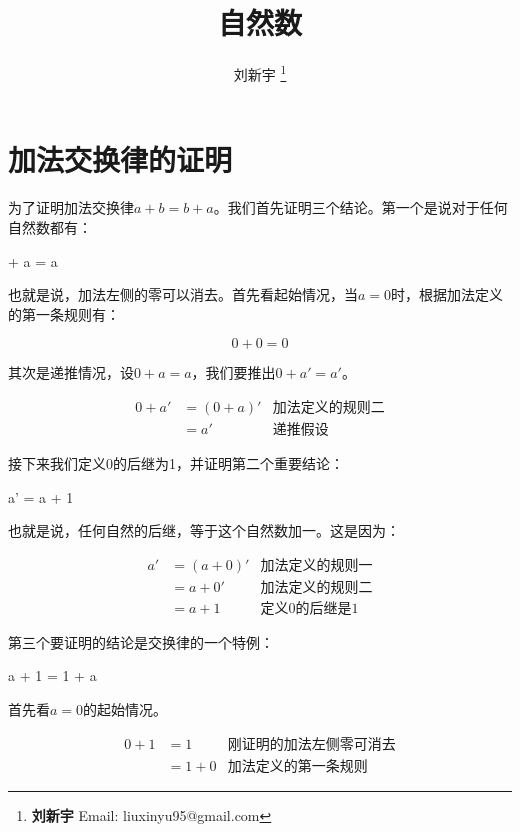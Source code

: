\documentclass[UTF8]{article}
\begin{document}
\title{自然数}

\author{刘新宇
\thanks{{\bfseries 刘新宇} \newline
  Email: liuxinyu95@gmail.com \newline}
  }

\maketitle
\fi


\section{加法交换律的证明}

为了证明加法交换律$a + b = b + a$。我们首先证明三个结论。第一个是说对于任何自然数都有：

 + a = a
\label{eq:left-zero}
\ee

也就是说，加法左侧的零可以消去。首先看起始情况，当$a=0$时，根据加法定义的第一条规则有：

\[
0 + 0 = 0
\]

其次是递推情况，设$0 + a = a$，我们要推出$0 + a' = a'$。

\[
\begin{array}{rlr}
0 + a' & = (0 + a)' & \text{加法定义的规则二} \\
       & = a' & \text{递推假设}
\end{array}
\]

接下来我们定义0的后继为1，并证明第二个重要结论：

\be
a' = a + 1
\label{eq:one-succ}
\ee

也就是说，任何自然的后继，等于这个自然数加一。这是因为：

\[
\begin{array}{rlr}
a' & = (a + 0)' & \text{加法定义的规则一} \\
   & = a + 0' & \text{加法定义的规则二} \\
   & = a + 1 & \text{定义0的后继是1}
\end{array}
\]

第三个要证明的结论是交换律的一个特例：

\be
a + 1 = 1 + a
\label{eq:one-commu}
\ee

首先看$a = 0$的起始情况。

\[
\begin{array}{rlr}
0 + 1 & = 1 & \text{刚证明的加法左侧零可消去} \\
      & = 1 + 0 & \text{加法定义的第一条规则}
\end{array}
\]
\end{document}
